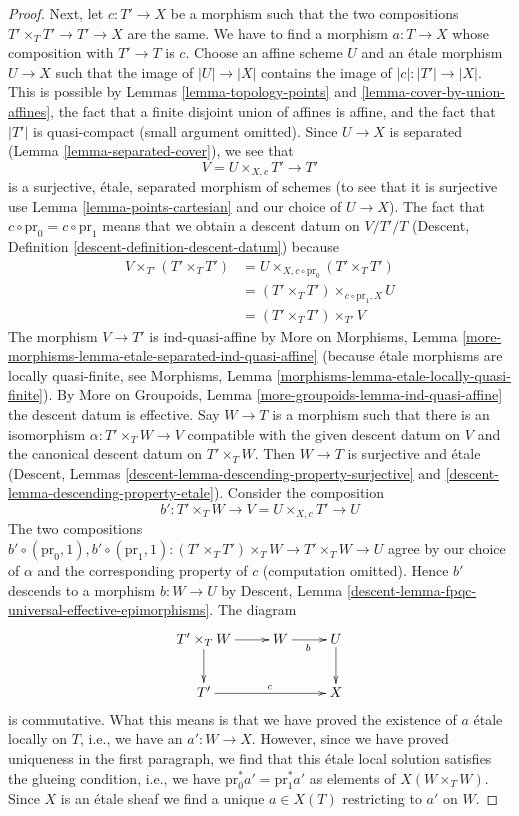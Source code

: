 \documentclass[10pt,a4paper]{amsart}
\theoremstyle{plain}
\theoremstyle{definition}
\theoremstyle{remark}
\numberwithin{equation}{subsection}
\begin{document}
\begin{proof}
\medskip\noindent
Next, let $c : T' \to X$ be a morphism such that the two compositions
$T' \times_T T' \to T' \to X$ are the same. We have to find a morphism
$a : T \to X$ whose composition with $T' \to T$ is $c$. Choose an
affine scheme $U$ and an \'etale morphism $U \to X$ such that the image
of $|U| \to |X|$ contains the image of $|c| : |T'| \to |X|$.
This is possible by Lemmas \ref{lemma-topology-points} and
\ref{lemma-cover-by-union-affines}, the fact that a finite disjoint union of
affines is affine, and the fact that $|T'|$ is quasi-compact
(small argument omitted). Since $U \to X$ is separated
(Lemma \ref{lemma-separated-cover}), we see that
$$
V = U \times_{X, c} T' \longrightarrow T'
$$
is a surjective, \'etale, separated morphism of schemes
(to see that it is surjective use Lemma \ref{lemma-points-cartesian}
and our choice of $U \to X$). The fact that
$c \circ \text{pr}_0 = c \circ \text{pr}_1$ means that we obtain a
descent datum on $V/T'/T$
(Descent, Definition \ref{descent-definition-descent-datum})
because
\begin{align*}
V \times_{T'} (T' \times_T T')
& =
U \times_{X, c \circ \text{pr}_0} (T' \times_T T') \\
& =
(T' \times_T T') \times_{c \circ \text{pr}_1, X} U \\
& =
(T' \times_T T') \times_{T'} V
\end{align*}
The morphism $V \to T'$ is ind-quasi-affine by
More on Morphisms, Lemma
\ref{more-morphisms-lemma-etale-separated-ind-quasi-affine}
(because \'etale morphisms are locally quasi-finite, see
Morphisms, Lemma \ref{morphisms-lemma-etale-locally-quasi-finite}).
By More on Groupoids, Lemma \ref{more-groupoids-lemma-ind-quasi-affine}
the descent datum is effective. Say $W \to T$ is a morphism
such that there is an isomorphism $\alpha : T' \times_T W \to V$
compatible with the given descent datum on $V$ and the canonical descent
datum on $T' \times_T W$. Then $W \to T$ is surjective and \'etale
(Descent, Lemmas \ref{descent-lemma-descending-property-surjective} and
\ref{descent-lemma-descending-property-etale}).
Consider the composition
$$
b' : T' \times_T W \longrightarrow V = U \times_{X, c} T' \longrightarrow U
$$
The two compositions
$b' \circ (\text{pr}_0, 1), 
b' \circ (\text{pr}_1, 1) :
(T' \times_T T') \times_T W \to T' \times_T W \to U$
agree by our choice of $\alpha$ and the corresponding property of $c$
(computation omitted). Hence $b'$ descends to a morphism $b : W \to U$ by
Descent, Lemma \ref{descent-lemma-fpqc-universal-effective-epimorphisms}.
The diagram
$$
\xymatrix{
T' \times_T W \ar[r] \ar[d] & W \ar[r]_b & U \ar[d] \\
T' \ar[rr]^c &  & X
}
$$
is commutative. What this means is that we have proved the existence
of $a$ \'etale locally on $T$, i.e., we have an $a' : W \to X$.
However, since we have proved uniqueness
in the first paragraph, we find that this \'etale local solution
satisfies the glueing condition, i.e., we have
$\text{pr}_0^*a' = \text{pr}_1^*a'$ as elements of $X(W \times_T W)$.
Since $X$ is an \'etale sheaf we find a unique $a \in X(T)$ restricting
to $a'$ on $W$.
\end{proof}
\end{document}
